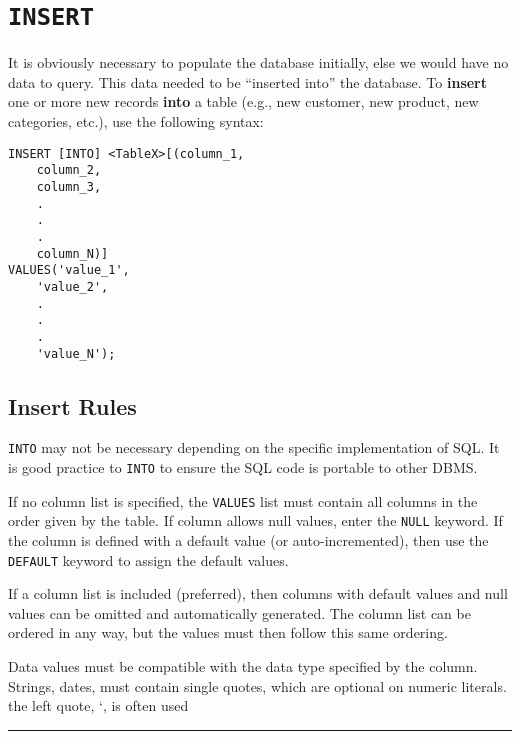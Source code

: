 \documentclass{article}
\begin{document}
\section*{\texttt{INSERT}}

It is obviously necessary to populate the database initially, else we would have no data to query.  This data needed to be ``inserted into'' the database.  To \textbf{insert} one or more new records \textbf{into} a table (e.g., new customer, new product, new categories, etc.), use the following syntax:

  
\begin{lstlisting}[frame=single]  
INSERT [INTO] <TableX>[(column_1, 
	column_2, 
	column_3, 
	. 
	.
	. 
	column_N)]
VALUES('value_1',
	'value_2',
	.
	.
	.
	'value_N');  
\end{lstlisting} 
  
  
  
 \subsection*{Insert Rules}

 \begin{outline}[enumerate]
	\1 \texttt{INTO} may not be necessary depending on the specific implementation of SQL.  
		\2 It is good practice to \texttt{INTO} to ensure the SQL code is portable to other DBMS.   

	\1 If no column list is specified, the \texttt{VALUES} list must contain all columns in the order given by the table.  
	\1 If column allows null values, enter the \texttt{NULL} keyword.  
	\1 If the column is defined with a default value (or auto-incremented), then use the \texttt{DEFAULT} keyword to assign the default values.
	
	\1 If a  column list is included (preferred), then columns with default values and null values can be omitted and automatically generated.  
	\1 The column list can be ordered in any way, but the values must then follow this same ordering.  
	
	\1 Data values must be compatible with the data type specified by the column.  
		\2 Strings, dates, must contain single quotes, which are optional on numeric literals.  
		\2 the left quote, `, is often used
	

\end{outline}
 
 
 
\hspace{-0.5cm}\rule[-0.101in]{\textwidth}{0.0025in}
  
\end{document}

